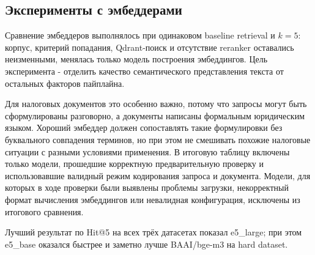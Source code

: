 \documentclass[a4paper,12pt]{article}
\begin{document}
\subsection{Эксперименты с эмбеддерами}

Сравнение эмбеддеров выполнялось при одинаковом baseline retrieval и $k=5$: корпус, критерий попадания, Qdrant-поиск и отсутствие reranker оставались неизменными, менялась только модель построения эмбеддингов. Цель эксперимента - отделить качество семантического представления текста от остальных факторов пайплайна.

Для налоговых документов это особенно важно, потому что запросы могут быть сформулированы разговорно, а документы написаны формальным юридическим языком. Хороший эмбеддер должен сопоставлять такие формулировки без буквального совпадения терминов, но при этом не смешивать похожие налоговые ситуации с разными условиями применения. В итоговую таблицу включены только модели, прошедшие корректную предварительную проверку и использовавшие валидный режим кодирования запроса и документа. Модели, для которых в ходе проверки были выявлены проблемы загрузки, некорректный формат вычисления эмбеддингов или невалидная конфигурация, исключены из итогового сравнения.

Лучший результат по Hit@5 на всех трёх датасетах показал e5\_large; при этом e5\_base оказался быстрее и заметно лучше BAAI/bge-m3 на hard dataset.
\end{document}
